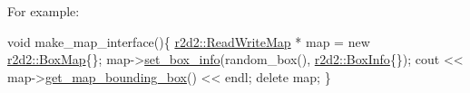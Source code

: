 For example\+: 
\begin{DoxyCodeInclude}
\textcolor{keywordtype}{void} make\_map\_interface()\{
    \hyperlink{classr2d2_1_1_read_write_map}{r2d2::ReadWriteMap} * map = \textcolor{keyword}{new} \hyperlink{classr2d2_1_1_box_map}{r2d2::BoxMap}\{\};
    map->\hyperlink{classr2d2_1_1_read_write_map_a8169c7a36a66b824403a4df7a91d232d}{set\_box\_info}(random\_box(), \hyperlink{classr2d2_1_1_box_info}{r2d2::BoxInfo}\{\});
    cout << map->\hyperlink{classr2d2_1_1_read_only_map_a322efcf80b3f461769e69cbb60a87b72}{get\_map\_bounding\_box}() << endl;
    \textcolor{keyword}{delete} map;
\}
\end{DoxyCodeInclude}
